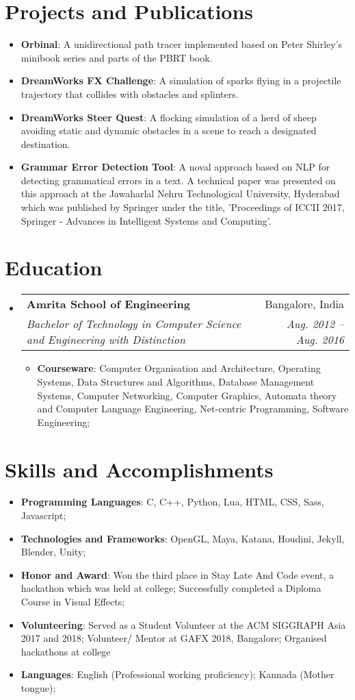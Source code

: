 \documentclass[a4paper,11pt]{article}
\makeatletter
\newcommand{\resumeItem}[2]{
  \item\small{
    \textbf{#1}{: #2 \vspace{-2pt}}
  }
}
\newcommand{\resumeSubheading}[4]{
  \vspace{-1pt}\item
    \begin{tabular*}{0.97\textwidth}[t]{l@{\extracolsep{\fill}}r}
      \textbf{#1} & #2 \\
      \textit{\small#3} & \textit{\small #4} \\
    \end{tabular*}
    \vspace{-5pt}
}
\newcommand{\resumeSubItem}[2]{
  \resumeItem{#1}{#2}
  \vspace{-4pt}
}
\newcommand{\resumeSubHeadingListStart}{
  \begin{itemize}[leftmargin=*]
}
\newcommand{\resumeSubHeadingListEnd}{
  \end{itemize}
}
\newcommand{\resumeItemListStart}{
  \begin{itemize}
}
\newcommand{\resumeItemListEnd}{
  \end{itemize}
  \vspace{-5pt}
}
\makeatother
\begin{document}
  \section{Projects and Publications}
    \resumeSubHeadingListStart
      \resumeSubItem{Orbinal}
        {A unidirectional path tracer implemented based on Peter Shirley's minibook series and parts of the PBRT book. }
      \resumeSubItem{DreamWorks FX Challenge}
        {A simulation of sparks flying in a projectile trajectory that collides with obstacles and splinters.}
      \resumeSubItem{DreamWorks Steer Quest}
        {A flocking simulation of a herd of sheep avoiding static and dynamic obstacles in a scene to reach a designated destination.}
      \resumeSubItem{Grammar Error Detection Tool}
        {A noval approach based on NLP for detecting grammatical errors in a text. A technical paper was presented on this approach at the Jawaharlal Nehru Technological University, Hyderabad which was published by Springer under the title, 'Proceedings of ICCII 2017, Springer - Advances in Intelligent Systems and Computing'.}
    \resumeSubHeadingListEnd

  \section{Education}
    \resumeSubHeadingListStart

      \resumeSubheading
        {Amrita School of Engineering}{Bangalore, India}
        {Bachelor of Technology in Computer Science and Engineering with Distinction}{Aug. 2012 -- Aug. 2016}

        \resumeItemListStart
          \resumeItem{Courseware}
            {Computer Organisation and Architecture, Operating Systems, Data Structures and Algorithms, Database Management Systems, Computer Networking, Computer Graphics, Automata theory and Computer Language Engineering, Net-centric Programming, Software Engineering;}
        \resumeItemListEnd
    \resumeSubHeadingListEnd

  \section{Skills and Accomplishments}
    \resumeSubHeadingListStart
      \resumeSubItem{Programming Languages}
        {C, C++, Python, Lua, HTML, CSS, Sass, Javascript;}
      \resumeSubItem{Technologies and Frameworks}
        {OpenGL, Maya, Katana, Houdini, Jekyll, Blender, Unity;}
      \resumeSubItem{Honor and Award}
        {Won the third place in Stay Late And Code event, a hackathon which was held at college; Successfully completed a Diploma Course in Visual Effects;}
      \resumeSubItem{Volunteering}
        {Served as a Student Volunteer at the ACM SIGGRAPH Asia 2017 and 2018;
          Volunteer/ Mentor at GAFX 2018, Bangalore;
          Organised hackathons at college}
      \resumeSubItem{Languages}
        {English (Professional working proficiency); Kannada (Mother tongue);}
    \resumeSubHeadingListEnd

\end{document}
